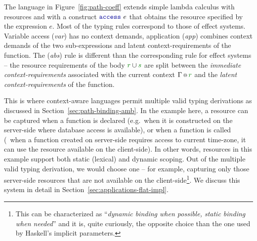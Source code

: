 The language in Figure~\ref{fig:path-coeff} extends simple lambda calculus with resources and
with a construct $\kvd{access}~e$ that obtains the resource specified by the expression $e$.
Most of the typing rules correspond to those of effect systems. Variable access (\emph{var})
has no context demands, application (\emph{app}) combines context demands of the two
sub-expressions and latent context-requirements of the function.
The (\emph{abs}) rule is different than the corresponding rule for effect systems -- the
resource requirements of the body $\cclrd{r} \cup \cclrd{s}$ are split between the \emph{immediate
context-requirements} associated with the current context $\coctx{\Gamma}{\cclrd{r}}$ and the
\emph{latent context-requirements} of the function.

This is where context-aware languages permit multiple valid typing derivations as discussed in
Section~\ref{sec:path-binding-amb}. In the example here, a resource can be captured
when a function is declared (e.g.~when it is constructed on the server-side where database access
is available), or when a function is called (\eg~when a function created on server-side requires
access to current time-zone, it can use the resource available on the client-side). In other words,
resources in this example support both static (lexical) and dynamic scoping. Out of the multiple
valid typing derivation, we would choose one -- for example, capturing only those server-side
resources that are not available on the client-side\footnote{This can be characterized as
``\emph{dynamic binding when possible, static binding when needed}'' and it is, quite curiously, the
opposite choice than the one used by Haskell's implicit parameters.}. We discuss this
system in detail in Section~\ref{sec:applications-flat-impl}.


